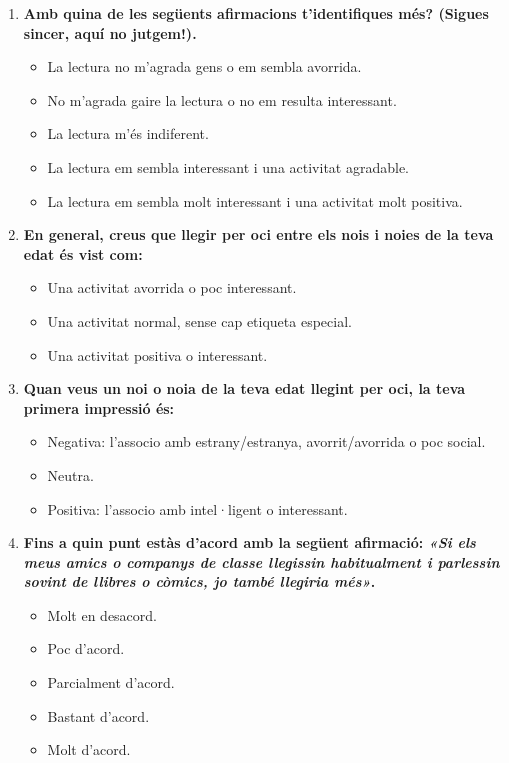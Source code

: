 \documentclass[12pt]{article}
\begin{document}
\begin{enumerate}
    \item \textbf{Amb quina de les següents afirmacions t'identifiques més? (Sigues sincer, aquí no jutgem!).}
    \begin{itemize}
        \item[$\square$] La lectura no m'agrada gens o em sembla avorrida.
        \item[$\square$] No m'agrada gaire la lectura o no em resulta interessant.
        \item[$\square$] La lectura m'és indiferent.
        \item[$\square$] La lectura em sembla interessant i una activitat agradable.
        \item[$\square$] La lectura em sembla molt interessant i una activitat molt positiva.
    \end{itemize}

    \item \textbf{En general, creus que llegir per oci entre els nois i noies de la teva edat és vist com:}
    \begin{itemize}
        \item[$\square$] Una activitat avorrida o poc interessant.
        \item[$\square$] Una activitat normal, sense cap etiqueta especial.
        \item[$\square$] Una activitat positiva o interessant.
    \end{itemize}

    \item \textbf{Quan veus un noi o noia de la teva edat llegint per oci, la teva primera impressió és:}
    \begin{itemize}
        \item[$\square$] Negativa: l'associo amb estrany/estranya, avorrit/avorrida o poc social.
        \item[$\square$] Neutra.
        \item[$\square$] Positiva: l'associo amb intel·ligent o interessant.
    \end{itemize}

    \item \textbf{Fins a quin punt estàs d'acord amb la següent afirmació: \textit{«Si els meus amics o companys de classe llegissin habitualment i parlessin sovint de llibres o còmics, jo també llegiria més»}.}
    \begin{itemize}
        \item[$\square$] Molt en desacord.
        \item[$\square$] Poc d'acord.
        \item[$\square$] Parcialment d'acord.
        \item[$\square$] Bastant d'acord.
        \item[$\square$] Molt d'acord.
    \end{itemize}
\end{enumerate}
\end{document}

